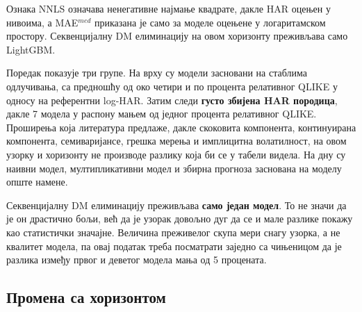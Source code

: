 Ознака NNLS означава ненегативне најмање квадрате, дакле HAR оцењен у нивоима, а
MAE$^{med}$ приказана је само за моделе оцењене у логаритамском простору.
Секвенцијалну DM елиминацију на овом хоризонту преживљава само LightGBM.

Поредак показује три групе. На врху су модели засновани на стаблима одлучивања, са
предношћу од око четири и по процента релативног QLIKE у односу на референтни log-HAR.
Затим следи \textbf{густо збијена HAR породица}, дакле 7 модела у распону мањем од
једног процента релативног QLIKE. Проширења која литература предлаже, дакле скоковита
компонента, континуирана компонента, семиваријансе, грешка мерења и имплицитна
волатилност, на овом узорку и хоризонту не производе разлику која би се у табели видела. На дну су наивни
модел, мултипликативни модел и збирна прогноза заснована на моделу опште намене.

Секвенцијалну DM елиминацију преживљава \textbf{само један модел}. То не значи да је он драстично бољи, већ да је узорак довољно дуг
да се и мале разлике покажу као статистички значајне. Величина преживелог скупа мери
снагу узорка, а не квалитет модела, па овај податак треба посматрати заједно са
чињеницом да је разлика између првог и деветог модела мања од 5 процената.

\subsection{Промена са хоризонтом}

